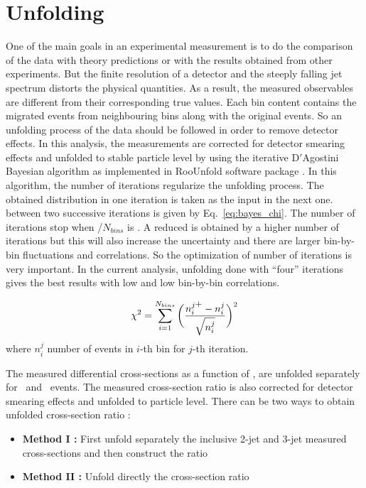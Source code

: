 \section{Unfolding}
\label{sec:unfolding}
One of the main goals in an experimental measurement is to do the comparison of the data with theory predictions or with the results obtained from other experiments. But the finite resolution of a detector and the steeply falling jet \pt spectrum distorts the physical quantities. As a result, the measured observables are different from their corresponding true values. Each \pt bin content contains the migrated events from neighbouring bins along with the original events. So an unfolding process of the data should be followed in order to remove detector effects. In this analysis, the measurements are corrected for detector smearing effects and unfolded to stable particle level by using the iterative D$'$Agostini Bayesian algorithm \cite{DAgostini:1994fjx,DAgostini} as implemented in RooUnfold software package \cite{Adye:2011gm}. In this algorithm, the number of iterations regularize the unfolding process. The obtained distribution in one iteration is taken as the input in the next one. \chisq between two successive iterations is given by Eq.~\ref{eq:bayes_chi}. The number of iterations stop when \chisq/$N_{bins}$ is . A reduced \chisq is obtained by a higher number of iterations but this will also increase the uncertainty and there are larger bin-by-bin fluctuations and correlations. So the optimization of number of iterations is very important. In the current analysis, unfolding done with ``four'' iterations gives the best results with low \chisq and low bin-by-bin correlations.

\begin{equation}
\label{eq:bayes_chi}
\chisq = \sum\limits_{i=1}^{N_{bins}}\bigg(\frac{n^{j\plusn}_{i} - n^{j}_{i}}{\sqrt{n^{j}_{i}}}\bigg)^{2}
\end{equation} 
where $n^{j}_{i}$ number of events in $i$-th bin for $j$-th iteration. 

The measured differential cross-sections as a function of \httwo, are unfolded separately for \njt~and \njth~events. The measured cross-section ratio \ratio is also corrected for detector smearing effects and unfolded to particle level. There can be two ways to obtain unfolded cross-section ratio :

\begin{itemize}
\item {\bf Method I :} First unfold separately the inclusive 2-jet and 3-jet measured cross-sections and then construct the ratio \ratio 
\item {\bf Method II :} Unfold directly the cross-section ratio \ratio
\end{itemize}

